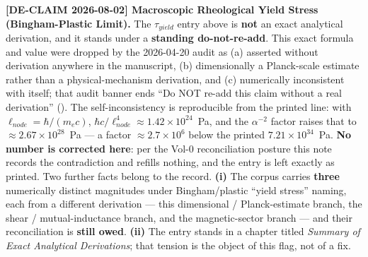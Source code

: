 \noindent\textbf{[DE-CLAIM 2026-08-02] Macroscopic Rheological Yield Stress (Bingham-Plastic Limit).} The $\tau_{yield}$ entry above is \textbf{not} an exact analytical derivation, and it stands under a \textbf{standing do-not-re-add}. This exact formula and value were dropped by the 2026-04-20 audit as (a) asserted without derivation anywhere in the manuscript, (b) dimensionally a Planck-scale estimate rather than a physical-mechanism derivation, and (c) numerically inconsistent with itself; that audit banner ends ``Do NOT re-add this claim without a real derivation'' (). The self-inconsistency is reproducible from the printed line: with $\ell_{node} = \hbar/(m_e c)$, $\hbar c/\ell_{node}^4 \approx 1.42 \times 10^{24}$~Pa, and the $\alpha^{-2}$ factor raises that to $\approx 2.67 \times 10^{28}$~Pa --- a factor $\approx 2.7 \times 10^{6}$ below the printed $7.21 \times 10^{34}$~Pa. \textbf{No number is corrected here}: per the Vol-0 reconciliation posture this note records the contradiction and refills nothing, and the entry is left exactly as printed. Two further facts belong to the record. \textbf{(i)} The corpus carries \textbf{three} numerically distinct magnitudes under Bingham/plastic ``yield stress'' naming, each from a different derivation --- this dimensional / Planck-estimate branch, the shear / mutual-inductance branch, and the magnetic-sector branch --- and their reconciliation is \textbf{still owed}. \textbf{(ii)} The entry stands in a chapter titled \emph{Summary of Exact Analytical Derivations}; that tension is the object of this flag, not of a fix.

